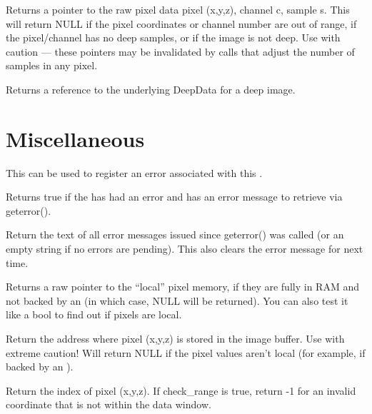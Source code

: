 Returns a pointer to the raw pixel data pixel {\cf (x,y,z)}, channel {\cf c},
sample {\cf s}.  This will return {\cf NULL} if the pixel
coordinates or channel number are out of range, if the pixel/channel has
no deep samples, or if the image is not deep. Use with caution --- these
pointers may be invalidated by calls that adjust the number of samples in
any pixel.
\apiend

Returns a reference to the underlying {\cf DeepData} for a deep image.
\apiend


\section{Miscellaneous}

This can be used to register an error associated with this \ImageBuf.
\apiend

Returns {\cf true} if the \ImageBuf has had an error and has an error
message to retrieve via {\cf geterror()}.
\apiend

Return the text of all error messages issued since {\cf geterror()} was
called (or an empty string if no errors are pending).  This also
clears the error message for next time.
\apiend

Returns a raw pointer to the ``local'' pixel memory, if they are fully
in RAM and not backed by an \ImageCache (in which case, {\cf NULL} will
be returned).  You can also test it like a {\cf bool} to find out if
pixels are local.
\apiend

Return the address where pixel (x,y,z) is stored in the image buffer.
Use with extreme caution!  Will return NULL if the pixel values
aren't local (for example, if backed by an \ImageCache).
\apiend

Return the index of pixel (x,y,z). If {\cf check_range} is {\cf true},
return -1 for an invalid coordinate that is not within the data window.
\apiend

